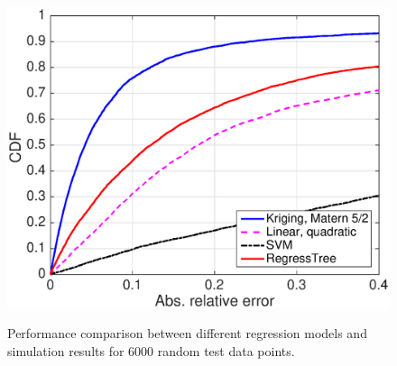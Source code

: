 \begin{figure}[t]
    \centering
{\includegraphics[width=0.8\columnwidth]{figures/all}}
  \caption{Performance comparison between different regression models and simulation results for 6000 random test data
points. \label{fig:regress-models}}
\end{figure}











